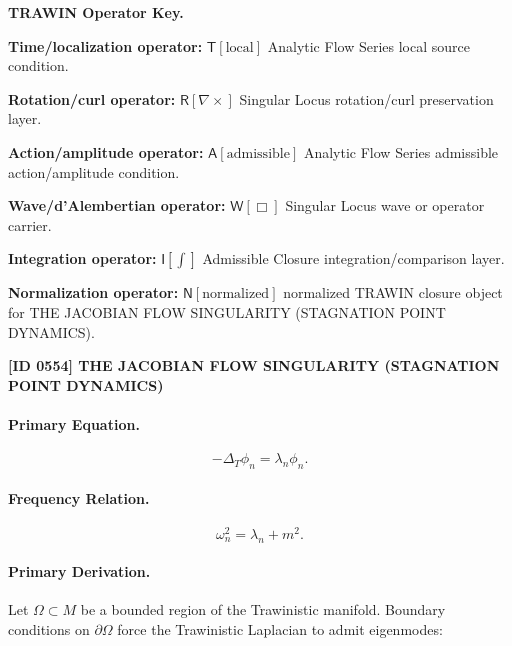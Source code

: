 \par\vspace{0.45\baselineskip}
\noindent\begin{minipage}[t]{\linewidth}
\begingroup
\small
\raggedright
\textbf{TRAWIN Operator Key.}\par
\noindent\textbf{Time/localization operator:} $\mathsf{T}\!\left[\mathrm{local}\right]$ Analytic Flow Series local source condition.\par
\noindent\textbf{Rotation/curl operator:} $\mathsf{R}\!\left[\nabla\times\right]$ Singular Locus rotation/curl preservation layer.\par
\noindent\textbf{Action/amplitude operator:} $\mathsf{A}\!\left[\mathrm{admissible}\right]$ Analytic Flow Series admissible action/amplitude condition.\par
\noindent\textbf{Wave/d'Alembertian operator:} $\mathsf{W}\!\left[\Box\right]$ Singular Locus wave or operator carrier.\par
\noindent\textbf{Integration operator:} $\mathsf{I}\!\left[\int\right]$ Admissible Closure integration/comparison layer.\par
\noindent\textbf{Normalization operator:} $\mathsf{N}\!\left[\mathrm{normalized}\right]$ normalized TRAWIN closure object for THE JACOBIAN FLOW SINGULARITY (STAGNATION POINT DYNAMICS).\par
\endgroup
\end{minipage}

\clearpage
\noindent\textbf{[ID 0554] THE JACOBIAN FLOW SINGULARITY (STAGNATION POINT DYNAMICS)}\par
\vspace{0.35em}
\paragraph{Primary Equation.}
\begin{equation}
-\Delta_T \phi_n = \lambda_n \phi_n .
\end{equation}

\paragraph{Frequency Relation.}
\begin{equation}
\omega_n^2 = \lambda_n + m^2 .
\end{equation}

\paragraph{Primary Derivation.}
Let $\Omega\subset M$ be a bounded region of the Trawinistic manifold.  
Boundary conditions on $\partial\Omega$ force the Trawinistic Laplacian to admit eigenmodes:

